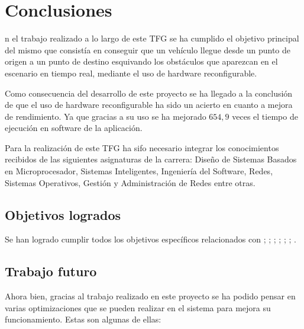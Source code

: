 \chapter{Conclusiones}\label{chap:conclusiones}

n el trabajo realizado a lo largo de este \ac{TFG} se ha cumplido el objetivo principal del mismo que consistía en conseguir que un vehículo llegue desde un punto de origen a un punto de destino esquivando los obstáculos que aparezcan en el escenario en tiempo real, mediante el uso de hardware reconfigurable. 

Como consecuencia del desarrollo de este proyecto se ha llegado a la conclusión de que el uso de hardware reconfigurable ha sido un acierto en cuanto a mejora de rendimiento. Ya que gracias a su uso se ha mejorado $654,9$  veces el tiempo de ejecución en software de la aplicación.

Para la realización de este \ac{TFG} ha sifo necesario integrar los conocimientos recibidos de las siguientes asignaturas de la carrera: Diseño de Sistemas Basados en Microprocesador, Sistemas Inteligentes, Ingeniería del Software, Redes, Sistemas Operativos, Gestión y Administración de Redes entre otras.

\section{Objetivos logrados}

Se han logrado cumplir todos los objetivos específicos relacionados con ; ; ; ; ; ;  .

\section{Trabajo futuro}

Ahora bien, gracias al trabajo realizado en este proyecto se ha podido pensar en varias optimizaciones que se pueden realizar en el sistema para mejora su funcionamiento. Estas son algunas de ellas:

